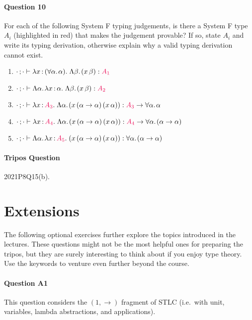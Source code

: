 \documentclass[11pt,a4paper,twoside]{article}
\begin{document}
\paragraph{Question 10} For each of the following System F typing
judgements, is there a System F type $A_i$ (highlighted in red) that
makes the judgement provable? If so, state $A_i$ and write its typing
derivation, otherwise explain why a valid typing derivation cannot exist.
\begin{enumerate}[label=(\alph*)]
  \item $\newcon \vdash
    \lam{x}{(\fora{\alpha}{\alpha})}{\Lam{\beta}{(\app{x}{\beta})}} :
    {\color{OrangeRed}{A_1}}$
  \item $\newcon \vdash
    \Lam{\alpha}{\lam{x}{\alpha}{\Lam{\beta}{(\app{x}{\beta})}}} :
    {\color{OrangeRed}{A_2}}$
  \item $\newcon \vdash
    \lam{x}{{\color{OrangeRed}{A_3}}}{\Lam{\alpha}{(\app{\app{x}{(\alpha
    \to \alpha)}}{(\app{x}{\alpha})})}} : {\color{OrangeRed}{A_3}}
    \to \fora{\alpha}{\alpha}$
  \item $\newcon \vdash
    \lam{x}{{\color{OrangeRed}{A_4}}}{\Lam{\alpha}{(\app{\app{x}{(\alpha
    \to \alpha)}}{(\app{x}{\alpha})})}} : {\color{OrangeRed}{A_4}}
    \to \fora{\alpha}{(\alpha \to \alpha)}$
  \item $\newcon \vdash
    \Lam{\alpha}{\lam{x}{{\color{OrangeRed}{A_5}}}{(\app{\app{x}{(\alpha
    \to \alpha)}}{(\app{x}{\alpha})})}} : \fora{\alpha}{(\alpha \to \alpha)}$
\end{enumerate}

\paragraph{Tripos Question} 2021P8Q15(b).

\section*{Extensions}

The following optional exercises further explore the topics
introduced in the lectures. These questions might not be the most
helpful ones for preparing the tripos, but they are surely
interesting to think about if you enjoy type theory. Use the keywords
to venture even further beyond the course.

\paragraph{Question A1} This question considers the $(1, \to)$
fragment of STLC (i.e.~with unit, variables, lambda abstractions, and
applications).
\end{document}
